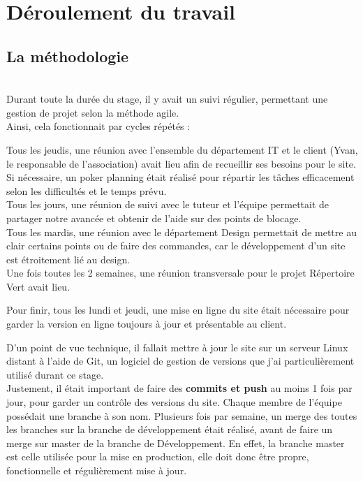 \section{Déroulement du travail}

\subsection{La méthodologie}
~\\

Durant toute la durée du stage, il y avait un suivi régulier, permettant une gestion de projet selon la méthode agile.\\

Ainsi, cela fonctionnait par cycles répétés :

Tous les jeudis, une réunion avec l'ensemble du département IT et le client (Yvan, le responsable de l'association) avait lieu afin de recueillir ses besoins pour le site.\\
Si nécessaire, un poker planning était réalisé pour répartir les tâches efficacement selon les difficultés et le temps prévu.\\

Tous les jours, une réunion de suivi avec le tuteur et l'équipe permettait de partager notre avancée et obtenir de l'aide sur des points de blocage.\\

Tous les mardis, une réunion avec le département Design permettait de mettre au clair certains points ou de faire des commandes, car le développement d'un site est étroitement lié au design.\\

Une fois toutes les 2 semaines, une réunion transversale pour le projet Répertoire Vert avait lieu.

Pour finir, tous les lundi et jeudi, une mise en ligne du site était nécessaire pour garder la version en ligne toujours à jour et présentable au client.

D'un point de vue technique, il fallait mettre à jour le site sur un serveur Linux distant à l'aide de Git, un logiciel de gestion de versions que j'ai particulièrement utilisé durant ce stage. \\

Justement, il était important de faire des \textbf{commits et push} au moins 1 fois par jour, pour garder un contrôle des versions du site.
Chaque membre de l'équipe possédait une branche à son nom. Plusieurs fois par semaine, un merge des toutes les branches sur la branche de développement était réalisé, avant de faire un merge sur master de la branche de Développement.
En effet, la branche master est celle utilisée pour la mise en production, elle doit donc être propre, fonctionnelle et régulièrement mise à jour. \\

